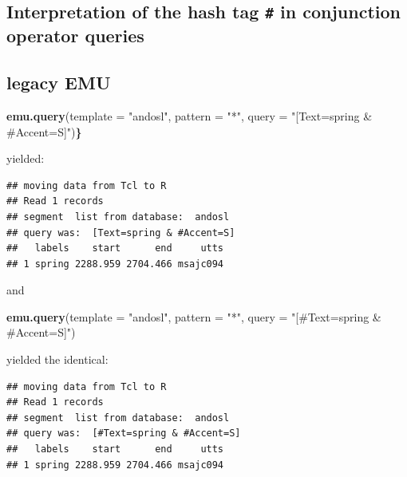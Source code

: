 \documentclass[]{book}
\newenvironment{Shaded}{\begin{snugshade}}{\end{snugshade}}
\newcommand{\DataTypeTok}[1]{\textcolor[rgb]{0.13,0.29,0.53}{#1}}
\newcommand{\ErrorTok}[1]{\textcolor[rgb]{0.64,0.00,0.00}{\textbf{#1}}}
\newcommand{\KeywordTok}[1]{\textcolor[rgb]{0.13,0.29,0.53}{\textbf{#1}}}
\newcommand{\NormalTok}[1]{#1}
\newcommand{\StringTok}[1]{\textcolor[rgb]{0.31,0.60,0.02}{#1}}
\begin{document}
\hypertarget{interpretation-of-the-hash-tag-in-conjunction-operator-queries}{%
\subsection{\texorpdfstring{Interpretation of the hash tag \texttt{\#} in conjunction operator queries}{Interpretation of the hash tag \# in conjunction operator queries}}\label{interpretation-of-the-hash-tag-in-conjunction-operator-queries}}

\hypertarget{legacy-emu}{%
\subsection{legacy EMU}\label{legacy-emu}}

\begin{Shaded}
\begin{Highlighting}[]
\KeywordTok{emu.query}\NormalTok{(}\DataTypeTok{template =} \StringTok{"andosl"}\NormalTok{, }
          \DataTypeTok{pattern =} \StringTok{"*"}\NormalTok{,}
          \DataTypeTok{query =} \StringTok{"[Text=spring & #Accent=S]"}\NormalTok{)}\ErrorTok{\}}
\end{Highlighting}
\end{Shaded}

yielded:

\begin{verbatim}
## moving data from Tcl to R
## Read 1 records
## segment  list from database:  andosl
## query was:  [Text=spring & #Accent=S]
##   labels    start      end     utts
## 1 spring 2288.959 2704.466 msajc094
\end{verbatim}

and

\begin{Shaded}
\begin{Highlighting}[]
\KeywordTok{emu.query}\NormalTok{(}\DataTypeTok{template =} \StringTok{"andosl"}\NormalTok{,}
          \DataTypeTok{pattern =} \StringTok{"*"}\NormalTok{,}
          \DataTypeTok{query =} \StringTok{"[#Text=spring & #Accent=S]"}\NormalTok{)}
\end{Highlighting}
\end{Shaded}

yielded the identical:

\begin{verbatim}
## moving data from Tcl to R
## Read 1 records
## segment  list from database:  andosl
## query was:  [#Text=spring & #Accent=S]
##   labels    start      end     utts
## 1 spring 2288.959 2704.466 msajc094
\end{verbatim}
\end{document}
